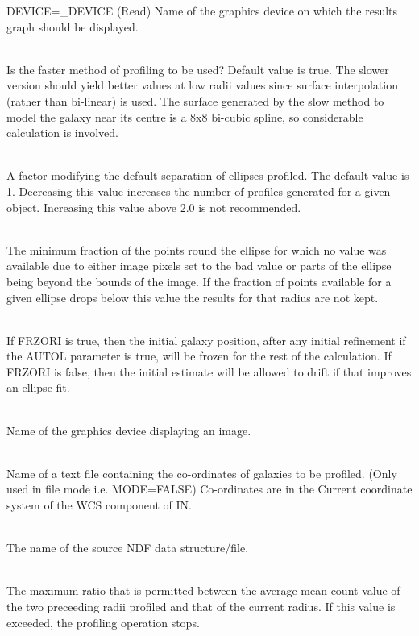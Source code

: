 \documentclass[twoside,11pt]{article}
\newcommand{\sstsubsection}[1]{ \item[{#1}] \mbox{} \\}
\newcommand{\sstsubsection}[1]{\item[{#1}]}
\begin{document}
{{{         DEVICE=\_DEVICE (Read)
      }{
         Name of the graphics device on which the results graph should
         be displayed.
      }
      \sstsubsection{
         FAST=\_LOGICAL (Read)
      }{
         Is the faster method of profiling to be used? Default value is
         true. The slower version should yield better values at low
         radii values since surface interpolation (rather than
         bi-linear) is used. The surface generated by the slow method to
         model the galaxy near its centre is a 8x8 bi-cubic spline, so
         considerable calculation is involved.
      }
      \sstsubsection{
         FINE=\_REAL (Read)
      }{
         A factor modifying the default separation of ellipses
         profiled. The default value is 1. Decreasing this value
         increases the number of profiles generated for a given object.
         Increasing this value above 2.0 is not recommended.
      }
      \sstsubsection{
         FRACT=\_REAL (Read)
      }{
         The minimum fraction of the points round the ellipse for which
         no value was available due to either image pixels set to the
         bad value or parts of the ellipse being beyond the bounds of
         the image. If the fraction of points available for a given
         ellipse drops below this value the results for that radius
         are not kept.
      }
      \sstsubsection{
         FRZORI=\_LOGICAL (Read)
      }{
         If FRZORI is true, then the initial galaxy position, after any
         initial refinement if the AUTOL parameter is true, will be
         frozen for the rest of the calculation.  If FRZORI is false,
         then the initial estimate will be allowed to drift if that
         improves an ellipse fit.
      }
      \sstsubsection{
         IMGDEV=\_DEVICE (Read)
      }{
         Name of the graphics device displaying an image.
      }
      \sstsubsection{
         INFILE=\_CHAR (Read)
      }{
         Name of a text file containing the co-ordinates of galaxies
         to be profiled. (Only used in file mode i.e. MODE=FALSE)
         Co-ordinates are in the Current coordinate system of the
         WCS component of IN.
      }
      \sstsubsection{
         IN=\_NDF (Read)
      }{
         The name of the source NDF data structure/file.
      }
      \sstsubsection{
         LIM1=\_REAL (Read)
      }{
         The maximum ratio that is permitted between the average mean
         count value of the two preceeding radii profiled and that of
         the current radius. If this value is exceeded, the profiling
         operation stops.
}}}
\end{document}
